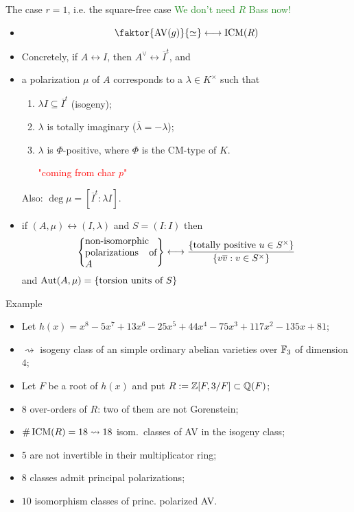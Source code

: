 \documentclass[usenames,dvipsnames]{beamer}
\DeclareMathOperator{\AV}{AV}
\newcommand{\green}[1]{\textcolor{ForestGreen}{#1}}
\begin{document}
\begin{frame}{ The case $r=1$, i.e. the square-free case }
\pause \green{We don't need $R$ Bass now! }
\pause 
\begin{itemize}
 \item \[ \faktor{\AV(g)}{\simeq} \longleftrightarrow \ICM(R) \]
\pause \item Concretely, if $A\leftrightarrow I$, then $A^\vee \leftrightarrow \overline{I}^t$, and
\pause \item a polarization $\mu$ of $A$ corresponds to a $\lambda\in K^\times$ such that
      \begin{enumerate}[-]
\pause \item $\lambda I \subseteq \overline{I}^t$ (isogeny);
\pause \item $\lambda$ is totally imaginary ($\overline \lambda = -\lambda$);
\pause \item $\lambda$ is $\Phi$-positive, where $\Phi$ is the CM-type of $K$. \textcolor{red}{\parbox{6em}{\center "coming from char $p$"}}
      \end{enumerate} 
\pause Also: $\deg \mu= [\overline{I}^t : \lambda I]$.
\pause  \item if $(A,\mu) \leftrightarrow (I,\lambda)$ and $S=(I:I)$ then
  \[\set{\parbox[p]{7.5em}{non-isomorphic polarizations of $A$}} \longleftrightarrow \dfrac{\set{\text{totally positive }u\in S^\times }}{\set{v\overline{v}: v\in S^\times}}\]
  and $\operatorname{Aut}(A,\mu) = \left\lbrace\text{torsion units of $S$}\right\rbrace$
\end{itemize}
\end{frame}

\begin{frame}{ Example}
\begin{itemize}
 \item Let $h(x)=x^8 - 5x^7 + 13x^6 - 25x^5 + 44x^4 - 75x^3 + 117x^2 - 135x + 81$;
 \item $\rightsquigarrow$ isogeny class of an simple ordinary abelian varieties over $\mathbb{F}_{3}$ of dimension $4$;
 \item Let $F$ be a root of $h(x)$ and put $R:=\mathbb{Z}[F,3/F]\subset \mathbb{Q}(F)$;
 \item $8$ over-orders of $R$: two of them are not Gorenstein;
 \item $\#\operatorname{ICM}(R) = 18 \rightsquigarrow 18$ isom.~classes of AV in the isogeny class;
 \item $5$ are not invertible in their multiplicator ring;
 \item $8$ classes admit principal polarizations;
 \item $10$ isomorphism classes of princ. polarized AV.
\end{itemize}
\end{frame}
\end{document}
